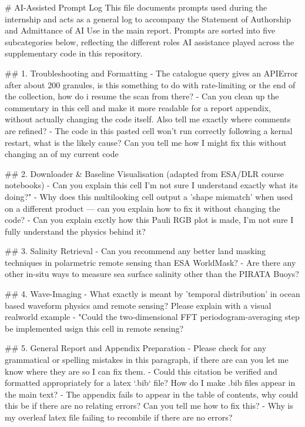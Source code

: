 # AI-Assisted Prompt Log
This file documents prompts used during the internship and acts as a general log to accompany the Statement of Authorship and Admittance of AI Use in the main report. 
Prompts are sorted into five subcategories below, reflecting the different roles AI assistance played across the supplementary code in this repository.

## 1. Troubleshooting and Formatting
- The catalogue query gives an APIError after about 200 granules, is this something to do with rate-limiting or the end of the collection, how do i resume the scan from
  there?  
- Can you clean up the commentary in this cell and make it more readable for a report appendix, without actually changing the code itself. Also tell me exactly where comments are refined?  
- The code in this pasted cell won't run correctly following a kernal restart, what is the likely cause? Can you tell me how I might fix this without changing an of my current code

## 2. Downloader & Baseline Visualisation (adapted from ESA/DLR course notebooks)
- Can you explain this cell I'm not sure I understand exactly what its doing?"
- Why does this multilooking cell output a 'shape mismatch' when used on a different product — can you explain how to fix it without changing the code?
- Can you explain exctly how this Pauli RGB plot is made, I'm not sure I fully understand the physics behind it? 

## 3. Salinity Retrieval
- Can you recommend any better land masking techniques in polarmetric remote sensing than ESA WorldMask?
- Are there any other in-situ ways to measure sea surface salinity other than the PIRATA Buoys?

## 4. Wave-Imaging
- What exactly is meant by 'temporal distribution' in ocean based waveform physics amd remote sensing? Please explain with a visual realworld example
- "Could the two-dimensional FFT periodogram-averaging step be implemented usign this cell in remote sensing?

## 5. General Report and Appendix Preparation
- Please check for any grammatical or spelling mistakes in this paragraph, if there are can you let me know where they are so I can fix them.
- Could this citation be verified and formatted appropriately for a latex `.bib` file? How do I make .bib files appear in the main text?
- The appendix fails to appear in the table of contents, why could this be if there are no relating errors? Can you tell me how to fix this?
- Why is my overleaf latex file failing to recombile if there are no errors?
